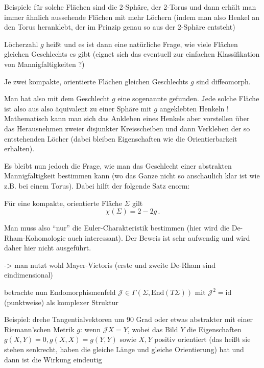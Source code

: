 \documentclass[../H_Analysis_main.tex]{subfiles}
\begin{document}
Beispiele für solche Flächen sind die 2-Sphäre, der 2-Torus und dann erhält man immer ähnlich aussehende Flächen mit mehr Löchern (indem man also Henkel an den Torus heranklebt, der im Prinzip genau so aus der 2-Sphäre entsteht)

Löcherzahl $g$ heißt  und es ist dann eine natürliche Frage, wie viele Flächen gleichen Geschlechts es gibt (eignet sich das eventuell zur einfachen Klassifikation von Mannigfaltigkeiten ?)

\begin{satz}
Je zwei kompakte, orientierte Flächen gleichen Geschlechts $g$ sind diffeomorph.
\end{satz}
Man hat also mit dem Geschlecht $g$ eine sogenannte  gefunden. Jede solche Fläche ist also aus also äquivalent zu einer Sphäre mit $g$ angeklebten Henkeln ! Mathematisch kann man sich das Ankleben eines Henkels aber vorstellen über das Herausnehmen zweier disjunkter Kreisscheiben und dann Verkleben der so entstehenden Löcher (dabei bleiben Eigenschaften wie die Orientierbarkeit erhalten).

Es bleibt nun jedoch die Frage, wie man das Geschlecht einer abstrakten Mannigfaltigkeit bestimmen kann (wo das Ganze nicht so anschaulich klar ist wie z.B. bei einem Torus). Dabei hilft der folgende Satz enorm:
\begin{satz}
Für eine kompakte, orientierte Fläche $\Sigma$ gilt
\begin{equation}
\chi(\Sigma) = 2 - 2g \, .
\end{equation}
\end{satz}
Man muss also \enquote{nur} die Euler-Charakteristik bestimmen (hier wird die De-Rham-Kohomologie auch interessant). Der Beweis ist sehr aufwendig und wird daher hier nicht ausgeführt.

-> man nutzt wohl Mayer-Vietoris (erste und zweite De-Rham sind eindimensional)


betrachte nun Endomorphismenfeld $\mathcal{J} \in \Gamma(\Sigma, \text{End}(T\Sigma))$ mit $\mathcal{J}^2 = \text{id}$ (punktweise) als komplexer Struktur


Beispiel: drehe Tangentialvektoren um 90 Grad oder etwas abstrakter mit einer Riemann'schen Metrik $g$: wenn $\mathcal{J}X = Y$, wobei das Bild $Y$ die Eigenschaften $g(X, Y) = 0, g(X, X) = g(Y, Y)$ sowie $X, Y$ positiv orientiert (das heißt sie stehen senkrecht, haben die gleiche Länge und gleiche Orientierung) hat und dann ist die Wirkung eindeutig
\end{document}
